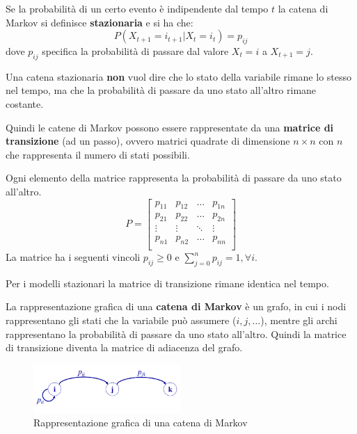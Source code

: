 Se la probabilità di un certo evento è indipendente dal tempo $t$ la catena di
Markov si definisce \textbf{stazionaria} e si ha che:
\begin{equation}
    P(X_{t+1} = i_{t+1 } | X_t =i_t) = p_{ij}
\end{equation}
dove $p_{ij}$ specifica la probabilità di passare dal valore $X_t = i$ a $X_{t + 1} = j$.
\begin{nota}
    Una catena stazionaria \textbf{non} vuol dire che lo stato della variabile
    rimane lo stesso nel tempo, ma che la probabilità di passare da uno stato
    all'altro rimane costante.
\end{nota}

Quindi le catene di Markov possono essere rappresentate da una \textbf{matrice di
    transizione} (ad un passo), ovvero matrici quadrate di dimensione $n \times n$
con $n$ che rappresenta il numero di stati possibili.

Ogni elemento della matrice rappresenta la probabilità di passare da uno stato
all'altro.
\begin{equation*}
    P = \begin{bmatrix}
        p_{11} & p_{12} & \dots  & p_{1n} \\
        p_{21} & p_{22} & \dots  & p_{2n} \\
        \vdots & \vdots & \ddots & \vdots \\
        p_{n1} & p_{n2} & \dots  & p_{nn} \\
    \end{bmatrix}
\end{equation*}
La matrice ha i seguenti vincoli $p_{ij} \geq 0$ e $\sum_{j=0}^{n}p_{ij}=1, \forall i$.
\begin{nota}
    Per i modelli stazionari la matrice di transizione rimane identica nel tempo.
\end{nota}

La rappresentazione grafica di una \textbf{catena di Markov} è un grafo, in cui i
nodi rappresentano gli stati che la variabile può assumere ($i,j,\dots$), mentre
gli archi rappresentano la probabilità di passare da uno stato all'altro. Quindi
la matrice di transizione diventa la matrice di adiacenza del grafo.
\begin{figure}[!ht]
    \centering
    \includegraphics[width=0.5\textwidth]{img/catene/markovChain.png}
    \caption{Rappresentazione grafica di una catena di Markov}
    \label{fig:markovChain}
\end{figure}


